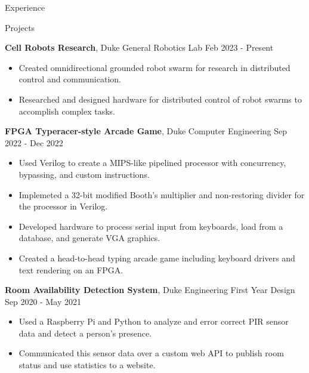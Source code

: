 \documentclass{resume}
\begin{document}
\begin{rSection}{Experience}



\end{rSection} 


\begin{rSection}{Projects}

\textbf{Cell Robots Research}, Duke General Robotics Lab \hfill{Feb 2023 - Present}
\begin{itemize}
    \item Created omnidirectional grounded robot swarm for research in distributed control and communication.
    \item Researched and designed hardware for distributed control of robot swarms to accomplish complex tasks.
\end{itemize}

\textbf{FPGA Typeracer-style Arcade Game}, Duke Computer Engineering \hfill{Sep 2022 - Dec 2022}
\begin{itemize}
    \itemsep -3pt {} 
    \item Used Verilog to create a MIPS-like pipelined processor with concurrency, bypassing, and custom instructions.
    \item Implemeted a 32-bit modified Booth's multiplier and non-restoring divider for the processor in Verilog.
    \item Developed hardware to process serial input from keyboards, load from a database, and generate VGA graphics.
    \item Created a head-to-head typing arcade game including keyboard drivers and text rendering on an FPGA.
\end{itemize}

\textbf{Room Availability Detection System}, Duke Engineering First Year Design \hfill{Sep 2020 - May 2021}
\begin{itemize}
    \itemsep -3pt {} 
    \item Used a Raspberry Pi and Python to analyze and error correct PIR sensor data and detect a person's presence.
    \item Communicated this sensor data over a custom web API to publish room status and use statistics to a website.
\end{itemize}

\end{rSection} 
\end{document}
